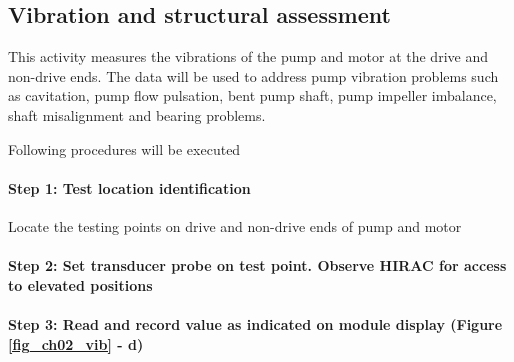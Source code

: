 \subsection{Vibration and structural assessment}
\label{235}
This activity measures the vibrations of the pump and motor at the drive and non-drive ends. The data will be used to address pump vibration problems such as cavitation, pump flow pulsation, bent pump shaft, pump impeller imbalance, shaft misalignment and bearing problems.

Following procedures will be executed

\paragraph{Step 1: Test location identification}

Locate the testing points on drive and non-drive ends of pump and motor %

\paragraph{Step 2: Set transducer probe on test point. Observe HIRAC for access to elevated positions}
\paragraph{Step 3: Read and record value as indicated on module display (Figure \ref{fig_ch02_vib} - d)}


